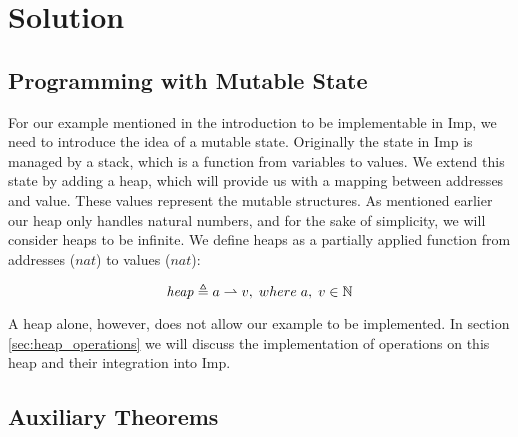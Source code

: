 \section{Solution}
\subsection{Programming with Mutable State}
\label{sec:programming_with_mutable_state}
For our example mentioned in the introduction to be implementable in Imp, we need to introduce the idea of a mutable state. Originally the state in Imp is managed by a stack, which is a function from variables to values. We extend this state by adding a heap, which will provide us with a mapping between addresses and value. These values represent the mutable structures. As mentioned earlier our heap only handles natural numbers, and for the sake of simplicity, we will consider heaps to be infinite. We define heaps as a partially applied function from addresses ($nat$) to values ($nat$):

\[
\mathit{heap} \mathrel{\triangleq} a\rightharpoonup v, \; where\; a, \;v \in \mathbb{N}
\] 

A heap alone, however, does not allow our example to be implemented. In section \ref{sec:heap_operations} we will discuss the implementation of operations on this heap and their integration into Imp. 





\subsection{Auxiliary Theorems}


